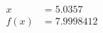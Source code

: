 \documentclass[preview]{standalone}
\begin{document}
\begin{align*}
x &= 5.0357\\f(x) &= 7.9998412
\end{align*}
\end{document}
